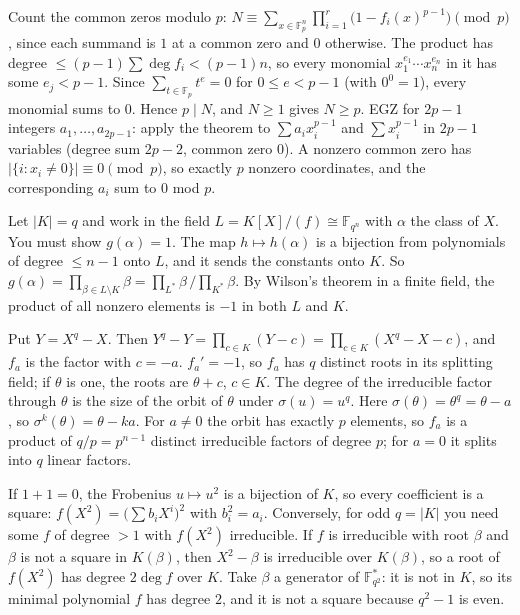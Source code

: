 \documentclass[11pt,a4paper]{article}
\begin{document}

 Count the common zeros modulo $p$: $N\equiv\sum_{x\in\mathbb{F}_p^n}\prod_{i=1}^r\bigl(1-f_i(x)^{p-1}\bigr)\pmod p$, since each summand is $1$ at a common zero and $0$ otherwise.
 The product has degree $\le(p-1)\sum\deg f_i<(p-1)n$, so every monomial $x_1^{e_1}\cdots x_n^{e_n}$ in it has some $e_j<p-1$. Since $\sum_{t\in\mathbb{F}_p}t^e=0$ for $0\le e<p-1$ (with $0^0=1$), every monomial sums to $0$. Hence $p\mid N$, and $N\ge1$ gives $N\ge p$.
 EGZ for $2p-1$ integers $a_1,\dots,a_{2p-1}$: apply the theorem to $\sum a_ix_i^{p-1}$ and $\sum x_i^{p-1}$ in $2p-1$ variables (degree sum $2p-2$, common zero $0$). A nonzero common zero has $|\{i:x_i\ne0\}|\equiv0\pmod p$, so exactly $p$ nonzero coordinates, and the corresponding $a_i$ sum to $0$ mod $p$.

 Let $|K|=q$ and work in the field $L=K[X]/(f)\cong\mathbb{F}_{q^n}$ with $\alpha$ the class of $X$. You must show $g(\alpha)=1$.
 The map $h\mapsto h(\alpha)$ is a bijection from polynomials of degree $\le n-1$ onto $L$, and it sends the constants onto $K$. So $g(\alpha)=\prod_{\beta\in L\setminus K}\beta=\prod_{L^*}\beta\,\big/\prod_{K^*}\beta$.
 By Wilson's theorem in a finite field, the product of all nonzero elements is $-1$ in both $L$ and $K$.

 Put $Y=X^q-X$. Then $Y^q-Y=\prod_{c\in K}(Y-c)=\prod_{c\in K}(X^q-X-c)$, and $f_a$ is the factor with $c=-a$.
 $f_a'=-1$, so $f_a$ has $q$ distinct roots in its splitting field; if $\theta$ is one, the roots are $\theta+c$, $c\in K$.
 The degree of the irreducible factor through $\theta$ is the size of the orbit of $\theta$ under $\sigma(u)=u^q$. Here $\sigma(\theta)=\theta^q=\theta-a$, so $\sigma^k(\theta)=\theta-ka$.
 For $a\ne0$ the orbit has exactly $p$ elements, so $f_a$ is a product of $q/p=p^{n-1}$ distinct irreducible factors of degree $p$; for $a=0$ it splits into $q$ linear factors.

 If $1+1=0$, the Frobenius $u\mapsto u^2$ is a bijection of $K$, so every coefficient is a square: $f(X^2)=\bigl(\sum b_iX^i\bigr)^2$ with $b_i^2=a_i$.
 Conversely, for odd $q=|K|$ you need some $f$ of degree $>1$ with $f(X^2)$ irreducible. If $f$ is irreducible with root $\beta$ and $\beta$ is not a square in $K(\beta)$, then $X^2-\beta$ is irreducible over $K(\beta)$, so a root of $f(X^2)$ has degree $2\deg f$ over $K$.
 Take $\beta$ a generator of $\mathbb{F}_{q^2}^*$: it is not in $K$, so its minimal polynomial $f$ has degree $2$, and it is not a square because $q^2-1$ is even.
\end{document}
